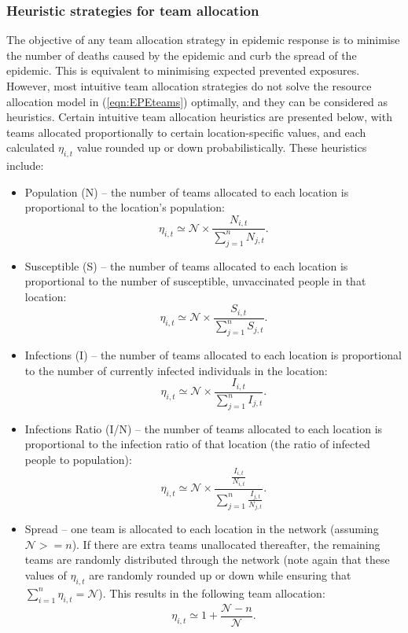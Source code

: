 \subsubsection{Heuristic strategies for team allocation}
The objective of any team allocation strategy in epidemic response is to minimise the number of deaths caused by the epidemic and curb the spread of the epidemic. This is equivalent to minimising expected prevented exposures. However, most intuitive team allocation strategies do not solve the resource allocation model in (\ref{eqn:EPEteams}) optimally, and they can be considered as heuristics. Certain intuitive team allocation heuristics are presented below, with teams allocated proportionally to certain location-specific values, and each calculated $\eta_{i,t}$ value rounded up or down probabilistically. These heuristics include:

\begin{itemize}
    \item Population (N) -- the number of teams allocated to each location is proportional to the location's population: $$\eta_{i,t} \simeq \mathcal{N} \times \frac{N_{i,t}}{\sum_{j=1}^{n} N_{j,t}}.$$
    \item Susceptible (S) -- the number of teams allocated to each location is proportional to the number of susceptible, unvaccinated people in that location: $$\eta_{i,t} \simeq \mathcal{N} \times \frac{S_{i,t}}{\sum_{j=1}^{n} S_{j,t}}.$$
    \item Infections (I) -- the number of teams allocated to each location is proportional to the number of currently infected individuals in the location: $$\eta_{i,t} \simeq \mathcal{N} \times \frac{I_{i,t}}{\sum_{j=1}^{n} I_{j,t}}.$$
    \item Infections Ratio (I/N) -- the number of teams allocated to each location is proportional to the infection ratio of that location (the ratio of infected people to population): $$\eta_{i,t} \simeq \mathcal{N} \times \frac{\frac{I_{i,t}}{N_{i,t}}}{\sum_{j=1}^{n} \frac{I_{j,t}}{N_{j,t}}}.$$
    \item Spread -- one team is allocated to each location in the network (assuming $\mathcal{N} >= n$). If there are extra teams unallocated thereafter, the remaining teams are randomly distributed through the network (note again that these values of $\eta_{i,t}$ are randomly rounded up or down while ensuring that $\sum_{i=1}^{n} \eta_{i,t} = \mathcal{N}$). This results in the following team allocation:
    $$\eta_{i,t} \simeq 1 + \frac{\mathcal{N} - n}{\mathcal{N}}.$$
\end{itemize}


